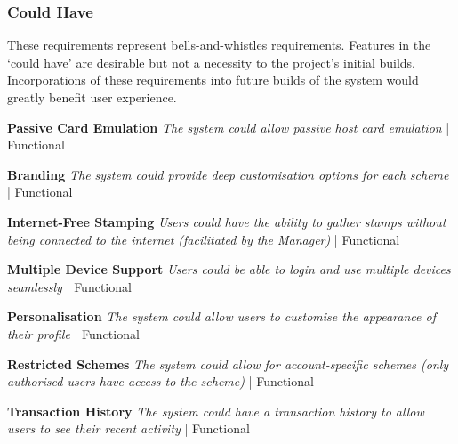 \subsubsection{Could Have}
These requirements represent bells-and-whistles requirements. Features in the `could have' are desirable but not a necessity to the project's initial builds. Incorporations of these requirements into future builds of the system would greatly benefit user experience.

\begin{description}[leftmargin=!,labelwidth=\widthof{\bfseries Medium}]
    \item[C1] \textbf{Passive Card Emulation} \newline
        \textit{The system could allow passive host card emulation}  | Functional

    \item[C2] \textbf{Branding} \newline
        \textit{The system could provide deep customisation options for each scheme}  | Functional

    \item[C3] \textbf{Internet-Free Stamping} \newline
        \textit{Users could have the ability to gather stamps without being connected to the internet (facilitated by the Manager)}  | Functional
        
    \item[C4] \textbf{Multiple Device Support} \newline
        \textit{Users could be able to login and use multiple devices seamlessly}  | Functional
        
    \item[C5] \textbf{Personalisation} \newline
        \textit{The system could allow users to customise the appearance of their profile}  | Functional
        
    \item[C6] \textbf{Restricted Schemes} \newline
        \textit{The system could allow for account-specific schemes (only authorised users have access to the scheme)}  | Functional
        
    \item[C7] \textbf{Transaction History} \newline
        \textit{The system could have a transaction history to allow users to see their recent activity}  | Functional
\end{description}

